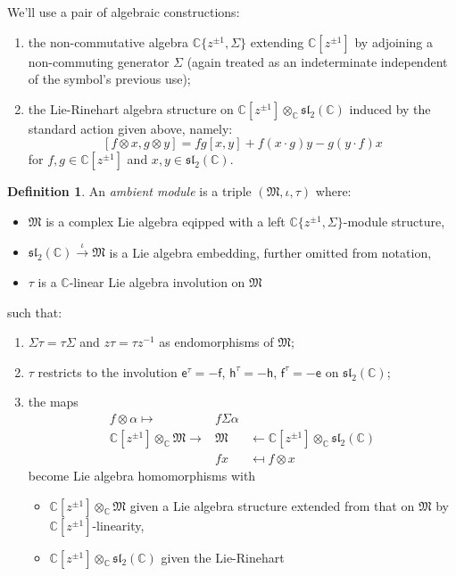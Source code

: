 \documentclass{article}
\def\fsl{\mathfrak{sl}}
\def\fM{\mathfrak{M}}
\def\CC{\mathbb{C}}
\def\inv{\tau} %
\def\e{\mathsf{e}}
\def\h{\mathsf{h}}
\def\f{\mathsf{f}}
\theoremstyle{definition}
\newtheorem{defn}{Definition}
\begin{document}
We'll use a pair of algebraic constructions:
\begin{enumerate}
        \item the non-commutative algebra $\CC\{z^{\pm1},\Sigma\}$
                extending $\CC[z^{\pm1}]$ by adjoining a non-commuting generator $\Sigma$ (again
                treated as an indeterminate independent of the symbol's previous use);
        \item the Lie-Rinehart algebra structure  
                on $\CC[z^{\pm1}]\otimes_\CC\fsl_2(\CC)$ induced
                by the standard action given above, namely:
                $$[f\otimes x,g\otimes y]
                = fg[x,y] + f(x\cdot g)y - g(y\cdot f)x$$
                for $f,g\in\CC[z^{\pm1}]$ and $x,y\in\fsl_2(\CC)$.
\end{enumerate}
\begin{defn}\label{def:amb-mod}
An \emph{ambient module} is
a triple $(\fM,\iota,\inv)$ 
where:
\begin{itemize}
\item $\fM$ is a complex Lie algebra
eqipped with
a left $\CC\{z^{\pm1},\Sigma\}$-module structure,
\item
$\fsl_2(\CC) \xrightarrow{\iota} \fM$ is
a Lie algebra embedding, further omitted from notation,
\item $\inv$ is a $\CC$-linear Lie algebra involution on $\fM$ 
\end{itemize}
such that:
\begin{enumerate}
\item $\Sigma\inv=\inv\Sigma$ and $z\inv=\inv z^{-1}$ as endomorphisms of $\fM$;
\item $\inv$ restricts to the involution
        $\e^\inv=-\f$, $\h^\inv=-\h$, $\f^\inv=-\e$ on $\fsl_2(\CC)$;
\item the maps \begin{eqnarray}
        f \otimes \alpha  \mapsto & f \Sigma\alpha \nonumber \\
        \CC[z^{\pm1}]\otimes_\CC \fM \rightarrow& \fM & \leftarrow\CC[z^{\pm1}]\otimes_\CC\fsl_2(\CC)  
        \label{eq:amb-mod-str}\\
                          & fx & \mapsfrom  f \otimes x \nonumber
\end{eqnarray}
become Lie algebra homomorphisms with
\begin{itemize}
\item $\CC[z^{\pm1}]\otimes_\CC\fM$ given a Lie algebra structure
        extended from that on $\fM$ by $\CC[z^{\pm1}]$-linearity,
\item $\CC[z^{\pm1}]\otimes_\CC\fsl_2(\CC)$ given the Lie-Rinehart

\end{itemize}
\end{enumerate}
\end{defn}
\end{document}

